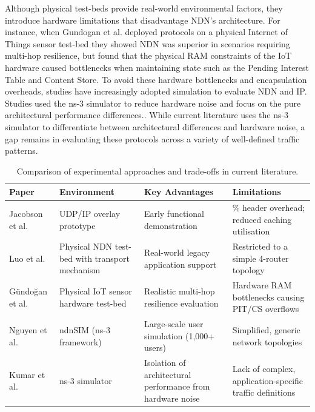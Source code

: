 \documentclass[12pt]{report}
\begin{document}
    Although physical test-beds provide real-world environmental factors, they introduce hardware limitations that disadvantage NDN's architecture. For instance, when Gundogan et al. deployed protocols on a physical Internet of Things sensor test-bed they showed NDN was superior in scenarios requiring multi-hop resilience, but found that the physical RAM constraints of the IoT hardware caused bottlenecks when maintaining state such as the Pending Interest Table and Content Store\cite{gundogan_ndn_2018}. To avoid these hardware bottlenecks and encapsulation overheads, studies have increasingly adopted simulation to evaluate NDN and IP. Studies used the ns-3 simulator to reduce hardware noise and focus on the pure architectural performance differences.\cite{kumar_comparing_2022}\cite{nguyen_cross-layer_2022}. While current literature uses the ns-3 simulator to differentiate between architectural differences and hardware noise, a gap remains in evaluating these protocols across a variety of well-defined traffic patterns.

\begin{table}[h!]
    \centering
    \begin{tabularx}{\textwidth}{@{} l >{\raggedright\arraybackslash}X >{\raggedright\arraybackslash}X >{\raggedright\arraybackslash}X @{}}
    \toprule
    \textbf{Paper} & \textbf{Environment} & \textbf{Key Advantages} & \textbf{Limitations} \\ 
    \midrule
    Jacobson et al. \cite{jacobson_networking_2009} & UDP/IP overlay prototype & Early functional demonstration & 22\% header overhead; reduced caching utilisation \\ \addlinespace
    Luo et al. \cite{luo_ipndn_2018} & Physical NDN test-bed with transport mechanism & Real-world legacy application support & Restricted to a simple 4-router topology \\ \addlinespace
    Gündoğan et al. \cite{gundogan_ndn_2018} & Physical IoT sensor hardware test-bed & Realistic multi-hop resilience evaluation & Hardware RAM bottlenecks causing PIT/CS overflows \\ \addlinespace
    Nguyen et al. \cite{nguyen_cross-layer_2022} & ndnSIM (ns-3 framework) & Large-scale user simulation (1,000+ users) & Simplified, generic network topologies \\ \addlinespace
    Kumar et al. \cite{kumar_comparing_2022} & ns-3 simulator & Isolation of architectural performance from hardware noise & Lack of complex, application-specific traffic definitions \\ 
    \bottomrule
    \end{tabularx}
    \caption{Comparison of experimental approaches and trade-offs in current literature.}
    \label{tab:experimental_approaches}
\end{table}
\clearpage
\end{document}
